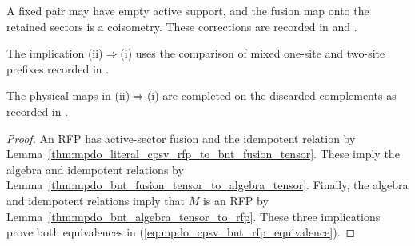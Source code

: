 \begin{theorem}
    A fixed pair may have empty active support, and the fusion map onto
    the retained sectors is a coisometry. These corrections are recorded in
    \cite{gap:cpsv16_figure11_per_pair_support} and
    \cite{gap:cpsv16_figure11_fusion_coisometry}.

    The implication (ii)$\Rightarrow$(i) uses the comparison of mixed
    one-site and two-site prefixes recorded in
    \cite{gap:cpsv16_two_site_sector_unitary_gauge_gap}.

    The physical maps in (ii)$\Rightarrow$(i) are completed on the
    discarded complements as recorded in
    \cite{gap:cpgsv17_vertical_isometry_zero_sector}.
\end{theorem}

\begin{proof}\leanok
    An RFP has active-sector fusion and the idempotent relation by
    Lemma~\ref{thm:mpdo_literal_cpsv_rfp_to_bnt_fusion_tensor}.
    These imply the algebra and idempotent relations by
    Lemma~\ref{thm:mpdo_bnt_fusion_tensor_to_algebra_tensor}.
    Finally, the algebra and idempotent relations imply that $M$ is an RFP by
    Lemma~\ref{thm:mpdo_bnt_algebra_tensor_to_rfp}. These three
    implications prove both equivalences in
    (\ref{eq:mpdo_cpsv_bnt_rfp_equivalence}).
\end{proof}

